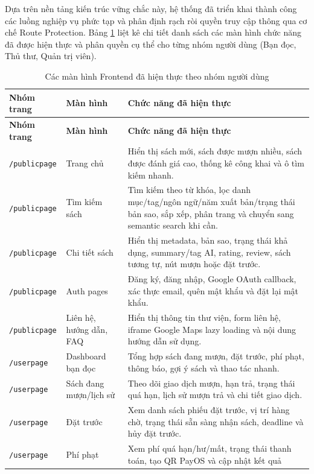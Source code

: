 Dựa trên nền tảng kiến trúc vững chắc này, hệ thống đã triển khai thành công các luồng nghiệp vụ phức tạp và phân định rạch ròi quyền truy cập thông qua cơ chế Route Protection. Bảng \ref{tab:fe_pages_implemented} liệt kê chi tiết danh sách các màn hình chức năng đã được hiện thực và phân quyền cụ thể cho từng nhóm người dùng (Bạn đọc, Thủ thư, Quản trị viên).

\begin{longtable}{|p{3.3cm}|p{3.8cm}|p{7.2cm}|}
\caption{Các màn hình Frontend đã hiện thực theo nhóm người dùng}
\label{tab:fe_pages_implemented}\\
\hline
\textbf{Nhóm trang} & \textbf{Màn hình} & \textbf{Chức năng đã hiện thực} \\
\hline
\endfirsthead
\hline
\textbf{Nhóm trang} & \textbf{Màn hình} & \textbf{Chức năng đã hiện thực} \\
\hline
\endhead
\texttt{/publicpage} & Trang chủ &
Hiển thị sách mới, sách được mượn nhiều, sách được đánh giá cao, thống kê công
khai và ô tìm kiếm nhanh. \\
\hline
\texttt{/publicpage} & Tìm kiếm sách &
Tìm kiếm theo từ khóa, lọc danh mục/tag/ngôn ngữ/năm xuất bản/trạng thái bản
sao, sắp xếp, phân trang và chuyển sang semantic search khi cần. \\
\hline
\texttt{/publicpage} & Chi tiết sách &
Hiển thị metadata, bản sao, trạng thái khả dụng, summary/tag AI, rating, review,
sách tương tự, nút mượn hoặc đặt trước. \\
\hline
\texttt{/publicpage} & Auth pages &
Đăng ký, đăng nhập, Google OAuth callback, xác thực email, quên mật khẩu và đặt
lại mật khẩu. \\
\hline
\texttt{/publicpage} & Liên hệ, hướng dẫn, FAQ &
Hiển thị thông tin thư viện, form liên hệ, iframe Google Maps lazy loading và
nội dung hướng dẫn sử dụng. \\
\hline
\texttt{/userpage} & Dashboard bạn đọc &
Tổng hợp sách đang mượn, đặt trước, phí phạt, thông báo, gợi ý sách và thao tác
nhanh. \\
\hline
\texttt{/userpage} & Sách đang mượn/lịch sử &
Theo dõi giao dịch mượn, hạn trả, trạng thái quá hạn, lịch sử mượn trả và chi
tiết giao dịch. \\
\hline
\texttt{/userpage} & Đặt trước &
Xem danh sách phiếu đặt trước, vị trí hàng chờ, trạng thái sẵn sàng nhận sách,
deadline và hủy đặt trước. \\
\hline
\texttt{/userpage} & Phí phạt &
Xem phí quá hạn/hư/mất, trạng thái thanh toán, tạo QR PayOS và cập nhật kết quả

\end{longtable}
